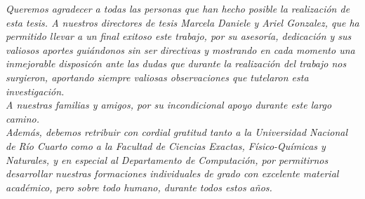 {\sl Queremos agradecer a todas las personas que han hecho posible la realización de esta tesis. A nuestros directores de tesis Marcela Daniele y Ariel Gonzalez, que ha permitido llevar a un final exitoso este trabajo, por su asesoría, dedicación y sus valiosos aportes guiándonos sin ser directivas y mostrando en cada momento una inmejorable disposicón ante las dudas que durante la realización del trabajo nos surgieron, aportando siempre valiosas observaciones que tutelaron esta investigación.}\\
{\sl A nuestras familias y amigos, por su incondicional apoyo durante este largo camino.}\\
{\sl Además, debemos retribuir con cordial gratitud tanto a la Universidad Nacional de Río Cuarto como a la Facultad de Ciencias Exactas, Físico-Químicas y Naturales, y en especial al Departamento de Computación, por permitirnos desarrollar nuestras formaciones individuales de grado con excelente material académico, pero sobre todo humano, durante todos estos años.
}\\





